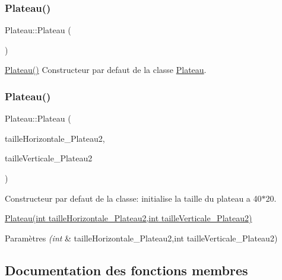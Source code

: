 \subsubsection{\texorpdfstring{Plateau()}{Plateau()}\hspace{0.1cm}{\footnotesize\ttfamily [1/2]}}
{\footnotesize\ttfamily Plateau\+::\+Plateau (\begin{DoxyParamCaption}{ }\end{DoxyParamCaption})}

\hyperlink{classPlateau_a07026170529dd928238ee45de0a797d7}{Plateau()} Constructeur par defaut de la classe \hyperlink{classPlateau}{Plateau}. \mbox{\label{classPlateau_a4f15309648ec9f987012565f80190b2b}} 
\subsubsection{\texorpdfstring{Plateau()}{Plateau()}\hspace{0.1cm}{\footnotesize\ttfamily [2/2]}}
{\footnotesize\ttfamily Plateau\+::\+Plateau (\begin{DoxyParamCaption}\item[{int}]{taille\+Horizontale\+\_\+\+Plateau2,  }\item[{int}]{taille\+Verticale\+\_\+\+Plateau2 }\end{DoxyParamCaption})}



Constructeur par defaut de la classe\+: initialise la taille du plateau a 40$\ast$20. 

\hyperlink{classPlateau_a4f15309648ec9f987012565f80190b2b}{Plateau(int taille\+Horizontale\+\_\+\+Plateau2,int taille\+Verticale\+\_\+\+Plateau2)} 
\begin{DoxyParams}{Paramètres}
{\em (int} & taille\+Horizontale\+\_\+\+Plateau2,int taille\+Verticale\+\_\+\+Plateau2) \\
\hline
\end{DoxyParams}


\subsection{Documentation des fonctions membres}
\mbox{\label{classPlateau_a85da7a234b6e619794b72980250e59dc}} 
